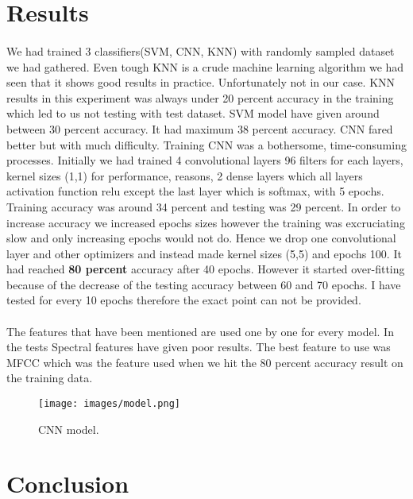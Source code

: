 \documentclass[10pt,twocolumn,letterpaper]{article}
\begin{document}
  \section{Results}
  \paragraph{} We had trained 3 classifiers(SVM, CNN, KNN) with randomly sampled dataset we had gathered. Even tough KNN is a crude machine learning algorithm we had seen that it shows good results in practice. Unfortunately not in our case. KNN results in this experiment was always under 20 percent accuracy in the training which led to us not testing with test dataset. SVM model have given around between 30 percent accuracy. It had maximum 38 percent accuracy. CNN fared better but with much difficulty. Training CNN was a bothersome, time-consuming processes. Initially we had trained 4 convolutional layers 96 filters for each layers, kernel sizes (1,1) for performance,   reasons, 2 dense layers which all layers activation function relu except the last layer which is softmax, with 5 epochs. Training accuracy was around 34 percent and testing was 29 percent. In order to increase accuracy we increased epochs sizes however the training was excruciating slow and only increasing epochs would not do. Hence we drop one convolutional layer and other optimizers and instead made kernel sizes (5,5) and epochs 100. It had reached \textbf{80 percent} accuracy after 40 epochs. However it started over-fitting because of the decrease of the testing accuracy between 60 and 70 epochs. I have tested for every 10 epochs therefore the exact point can not be provided. 
 
  \paragraph{} The features that have been mentioned are used one by one for every model. In the tests Spectral features have given poor results. The best feature to use was MFCC which was the feature used when we hit the 80 percent accuracy result on the training data.
  \begin{figure}[H]
    \begin{center}
    \texttt{[image: images/model.png]}
    \end{center}  
       \caption{CNN model.}
    \label{fig:model}
    \label{fig:onecol}
  \end{figure} 
  \section{Conclusion}
\end{document}
